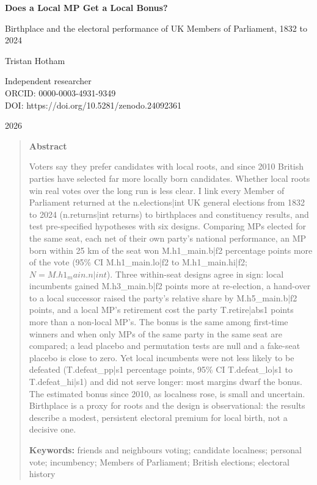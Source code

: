 \documentclass[11pt,a4paper]{article}
\begin{document}
\begin{center}
{\LARGE\bfseries Does a Local MP Get a Local Bonus?\par}
\vspace{0.4em}
{\large Birthplace and the electoral performance of UK Members of Parliament, 1832 to 2024\par}
\vspace{1.2em}
{\large Tristan Hotham\par}
\vspace{0.3em}
{\small Independent researcher\\
ORCID: 0000-0003-4931-9349\\
DOI: https://doi.org/10.5281/zenodo.24092361\par}
\vspace{0.8em}
2026
\end{center}

\begin{quote}
\small
\begin{center}\textbf{Abstract}\end{center}
Voters say they prefer candidates with local roots, and since 2010 British parties have selected far more locally born candidates. Whether local roots win real votes over the long run is less clear. I link every Member of Parliament returned at the {{n.elections|int}} UK general elections from 1832 to 2024 ({{n.returns|int}} returns) to birthplaces and constituency results, and test pre-specified hypotheses with six designs. Comparing MPs elected for the same seat, each net of their own party's national performance, an MP born within 25 km of the seat won {{M.h1_main.b|f2}} percentage points more of the vote (95\% CI {{M.h1_main.lo|f2}} to {{M.h1_main.hi|f2}}; $N={{M.h1_main.n|int}}$). Three within-seat designs agree in sign: local incumbents gained {{M.h3_main.b|f2}} points more at re-election, a hand-over to a local successor raised the party's relative share by {{M.h5_main.b|f2}} points, and a local MP's retirement cost the party {{T.retire|abs1}} points more than a non-local MP's. The bonus is the same among first-time winners and when only MPs of the same party in the same seat are compared; a lead placebo and permutation tests are null and a fake-seat placebo is close to zero. Yet local incumbents were not less likely to be defeated ({{T.defeat_pp|s1}} percentage points, 95\% CI {{T.defeat_lo|s1}} to {{T.defeat_hi|s1}}) and did not serve longer: most margins dwarf the bonus. The estimated bonus since 2010, as localness rose, is small and uncertain. Birthplace is a proxy for roots and the design is observational: the results describe a modest, persistent electoral premium for local birth, not a decisive one.

\textbf{Keywords:} friends and neighbours voting; candidate localness; personal vote; incumbency; Members of Parliament; British elections; electoral history
\end{quote}
\end{document}

